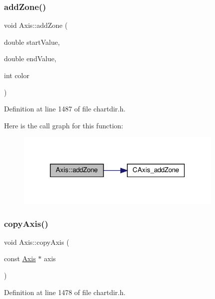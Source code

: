 \subsubsection{\texorpdfstring{add\+Zone()}{addZone()}}
{\footnotesize\ttfamily void Axis\+::add\+Zone (\begin{DoxyParamCaption}\item[{double}]{start\+Value,  }\item[{double}]{end\+Value,  }\item[{int}]{color }\end{DoxyParamCaption})\hspace{0.3cm}{\ttfamily [inline]}}



Definition at line 1487 of file chartdir.\+h.

Here is the call graph for this function\+:
\nopagebreak
\begin{figure}[H]
\begin{center}
\leavevmode
\includegraphics[width=282pt]{class_axis_a999b49b9678d07a36a4175fd0a81fabd_cgraph}
\end{center}
\end{figure}
\mbox{\label{class_axis_a66990afb53a3c4b709178d1cb019092c}} 
\subsubsection{\texorpdfstring{copy\+Axis()}{copyAxis()}}
{\footnotesize\ttfamily void Axis\+::copy\+Axis (\begin{DoxyParamCaption}\item[{const \hyperlink{class_axis}{Axis} $\ast$}]{axis }\end{DoxyParamCaption})\hspace{0.3cm}{\ttfamily [inline]}}



Definition at line 1478 of file chartdir.\+h.


